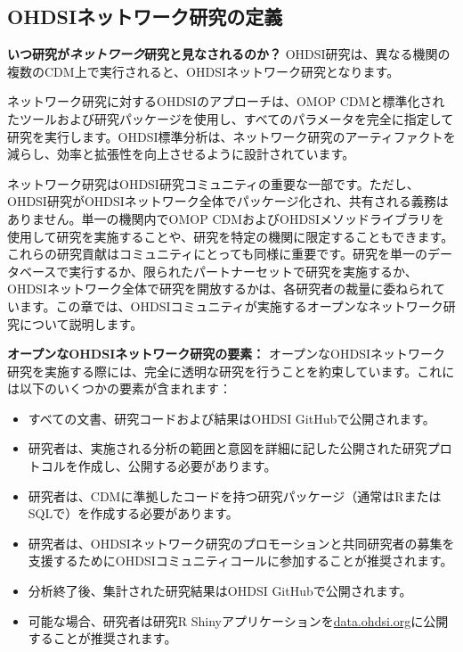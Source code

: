 \documentclass[
  11pt]{book}
\makeatletter
\providecommand{\tightlist}{%
  \setlength{\itemsep}{0pt}\setlength{\parskip}{0pt}}
\newenvironment{kframe}{%
\medskip{}
\setlength{\fboxsep}{.8em}
 \def\at@end@of@kframe{}%
 \ifinner\ifhmode%
  \def\at@end@of@kframe{\end{minipage}}%
  \begin{minipage}{\columnwidth}%
 \fi\fi%
 \def\FrameCommand##1{\hskip\@totalleftmargin \hskip-\fboxsep
 \colorbox{myShadeColor}{##1}\hskip-\fboxsep
     \hskip-\linewidth \hskip-\@totalleftmargin \hskip\columnwidth}%
 \MakeFramed {\advance\hsize-\width
   \@totalleftmargin\z@ \linewidth\hsize
   \@setminipage}}%
 {\par\unskip\endMakeFramed%
 \at@end@of@kframe}
\newenvironment{rmdblock}[1]
  {
  \begin{itemize}
  \renewcommand{\labelitemi}{
    \raisebox{-.7\height}[0pt][0pt]{
      {\setkeys{Gin}{width=3em,keepaspectratio}\texttt{[image: images/\#1]}}
    }
  }
  \setlength{\fboxsep}{1em}
  \begin{kframe}
  \item
  }
  {
  \end{kframe}
  \end{itemize}
  }
\newenvironment{rmdimportant}
  {\begin{rmdblock}{important}}
  {\end{rmdblock}}
\theoremstyle{definition}
\theoremstyle{definition}
\theoremstyle{definition}
\theoremstyle{definition}
\theoremstyle{remark}
\makeatother
\begin{document}
\subsection{OHDSIネットワーク研究の定義}\label{ohdsiux30cdux30c3ux30c8ux30efux30fcux30afux7814ux7a76ux306eux5b9aux7fa9}

\begin{rmdimportant}
\textbf{いつ研究が\emph{ネットワーク}研究と見なされるのか？} OHDSI研究は、異なる機関の複数のCDM上で実行されると、OHDSIネットワーク研究となります。
\end{rmdimportant}

ネットワーク研究に対するOHDSIのアプローチは、OMOP CDMと標準化されたツールおよび研究パッケージを使用し、すべてのパラメータを完全に指定して研究を実行します。OHDSI標準分析は、ネットワーク研究のアーティファクトを減らし、効率と拡張性を向上させるように設計されています。

ネットワーク研究はOHDSI研究コミュニティの重要な一部です。ただし、OHDSI研究がOHDSIネットワーク全体でパッケージ化され、共有される義務はありません。単一の機関内でOMOP CDMおよびOHDSIメソッドライブラリを使用して研究を実施することや、研究を特定の機関に限定することもできます。これらの研究貢献はコミュニティにとっても同様に重要です。研究を単一のデータベースで実行するか、限られたパートナーセットで研究を実施するか、OHDSIネットワーク全体で研究を開放するかは、各研究者の裁量に委ねられています。この章では、OHDSIコミュニティが実施するオープンなネットワーク研究について説明します。

\textbf{オープンなOHDSIネットワーク研究の要素：}
オープンなOHDSIネットワーク研究を実施する際には、完全に透明な研究を行うことを約束しています。これには以下のいくつかの要素が含まれます：

\begin{itemize}
\tightlist
\item
  すべての文書、研究コードおよび結果はOHDSI GitHubで公開されます。
\item
  研究者は、実施される分析の範囲と意図を詳細に記した公開された研究プロトコルを作成し、公開する必要があります。
\item
  研究者は、CDMに準拠したコードを持つ研究パッケージ（通常はRまたはSQLで）を作成する必要があります。
\item
  研究者は、OHDSIネットワーク研究のプロモーションと共同研究者の募集を支援するためにOHDSIコミュニティコールに参加することが推奨されます。
\item
  分析終了後、集計された研究結果はOHDSI GitHubで公開されます。
\item
  可能な場合、研究者は研究R Shinyアプリケーションを\href{http://data.ohdsi.org}{data.ohdsi.org}に公開することが推奨されます。
\end{itemize}
\end{document}
